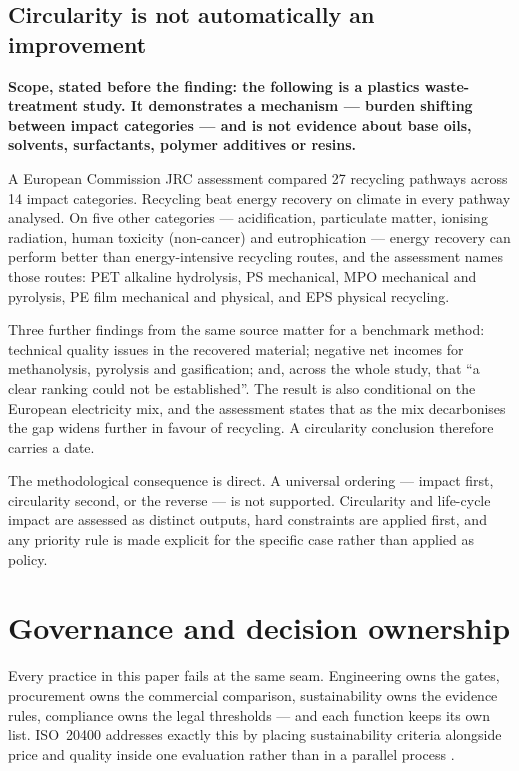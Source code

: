 \documentclass[10pt,twocolumn,a4paper]{article}
\begin{document}
\subsection{Circularity is not automatically an improvement}

\textbf{Scope, stated before the finding: the following is a plastics
waste-treatment study. It demonstrates a mechanism --- burden shifting between
impact categories --- and is not evidence about base oils, solvents, surfactants,
polymer additives or resins.}

A European Commission JRC assessment \cite{p2} compared 27 recycling pathways
across 14 impact categories. Recycling beat energy recovery on climate in every
pathway analysed. On five other categories --- acidification, particulate matter,
ionising radiation, human toxicity (non-cancer) and eutrophication --- energy
recovery can perform better than energy-intensive recycling routes, and the
assessment names those routes: PET alkaline hydrolysis, PS mechanical, MPO
mechanical and pyrolysis, PE film mechanical and physical, and EPS physical
recycling.

Three further findings from the same source matter for a benchmark method:
technical quality issues in the recovered material; negative net incomes for
methanolysis, pyrolysis and gasification; and, across the whole study, that ``a
clear ranking could not be established''. The result is also conditional on the
European electricity mix, and the assessment states that as the mix decarbonises
the gap widens further in favour of recycling. A circularity conclusion therefore
carries a date.

The methodological consequence is direct. A universal ordering --- impact first,
circularity second, or the reverse --- is not supported. Circularity and
life-cycle impact are assessed as distinct outputs, hard constraints are applied
first, and any priority rule is made explicit for the specific case rather than
applied as policy.

\section{Governance and decision ownership}
\label{sec:governance}

Every practice in this paper fails at the same seam. Engineering owns the gates,
procurement owns the commercial comparison, sustainability owns the evidence
rules, compliance owns the legal thresholds --- and each function keeps its own
list. ISO~20400 addresses exactly this by placing sustainability criteria
alongside price and quality inside one evaluation rather than in a parallel
process \cite{a1}.
\end{document}

